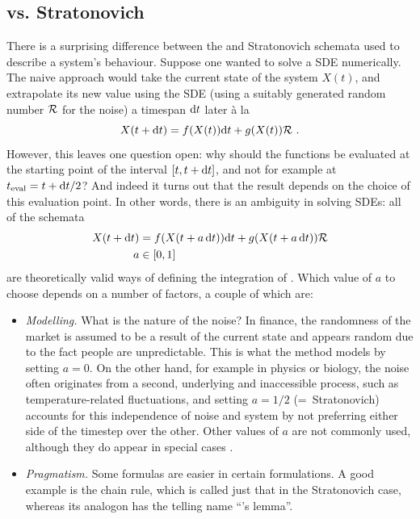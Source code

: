 \subsection{\Ito{} vs. Stratonovich}
\label{sec:ito-stratonovich dilemma}

There is a surprising difference between the \Ito{} and Stratonovich schemata used to describe a system's behaviour. Suppose one wanted to solve a SDE numerically. The naive approach would take the current state of the system \(X(t)\), and extrapolate its new value using the SDE (using a suitably generated random number \(\mathcal{R}\) for the noise) a timespan \(\mathrm{d} t\) later \`a la
%
\begin{equation}
	X(t+\mathrm{d} t) = f(X(t))\mathrm{d} t + g(X(t)) \mathcal{R} ~.
\end{equation}
%
However, this leaves one question open: why should the functions be evaluated at the starting point of the interval \([t,t+\mathrm{d} t]\), and not for example at \(t_\text{eval} = t+\mathrm{d} t/2\)? And indeed it turns out that the result depends on the choice of this evaluation point. In other words, there is an ambiguity in solving SDEs: all of the schemata
%
\begin{align}
	X(t+\mathrm{d} t) &= f(X(t+a\,\mathrm{d} t))\mathrm{d} t + g(X(t+a\,\mathrm{d} t)) \mathcal{R} \\
	a &\in [0,1]
\end{align}
%
are theoretically valid ways of defining the integration of . Which value of \(a\) to choose depends on a number of factors, a couple of which are:
%
\begin{itemize}
	\item \emph{Modelling.} What is the nature of the noise? In finance, the randomness of the market is assumed to be a result of the current state and appears random due to the fact people are unpredictable. This is what the \Ito{} method models by setting \(a = 0\). On the other hand, for example in physics or biology, the noise often originates from a second, underlying and inaccessible process, such as temperature-related fluctuations, and setting \(a = 1/2\) (=~Stratonovich) accounts for this independence of noise and system by not preferring either side of the timestep over the other. Other values of \(a\) are not commonly used, although they do appear in special cases .
	\item \emph{Pragmatism.} Some formulas are easier in certain formulations. A good example is the chain rule, which is called just that in the Stratonovich case, whereas its analogon has the telling name ``\Ito{}'s lemma''.
\end{itemize}
